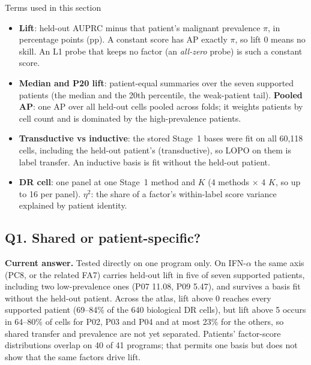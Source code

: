 \begin{explainbox}{Terms used in this section}
\begin{itemize}
\item \textbf{Lift}: held-out AUPRC minus that patient's malignant prevalence $\pi$, in percentage points (pp). A constant score has AP exactly $\pi$, so lift 0 means no skill. An L1 probe that keeps no factor (an \emph{all-zero} probe) is such a constant score.
\item \textbf{Median and P20 lift}: patient-equal summaries over the seven supported patients (the median and the 20th percentile, the weak-patient tail). \textbf{Pooled AP}: one AP over all held-out cells pooled across folds; it weights patients by cell count and is dominated by the high-prevalence patients.
\item \textbf{Transductive vs inductive}: the stored Stage~1 bases were fit on all 60,118 cells, including the held-out patient's (transductive), so LOPO on them is label transfer. An inductive basis is fit without the held-out patient.
\item \textbf{DR cell}: one panel at one Stage~1 method and $K$ (4 methods $\times$ 4 $K$, so up to 16 per panel). \textbf{$\eta^2$}: the share of a factor's within-label score variance explained by patient identity.
\end{itemize}
\end{explainbox}

\subsection{Q1. Shared or patient-specific?}

\textbf{Current answer.} Tested directly on one program only. On IFN-$\alpha$ the same axis (PC8, or the related FA7) carries held-out lift in five of seven supported patients, including two low-prevalence ones (P07 11.08\pp, P09 5.47\pp), and survives a basis fit without the held-out patient. Across the atlas, lift above 0 reaches every supported patient (69--84\% of the 640 biological DR cells), but lift above 5\pp{} occurs in 64--80\% of cells for P02, P03 and P04 and at most 23\% for the others, so shared transfer and prevalence are not yet separated. Patients' factor-score distributions overlap on 40 of 41 programs; that permits one basis but does not show that the same factors drive lift.

